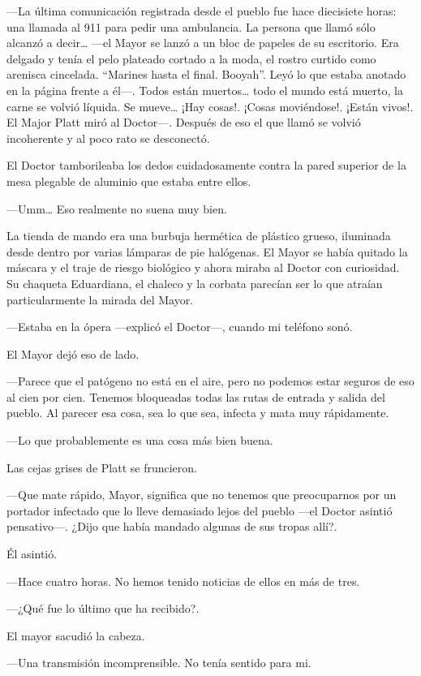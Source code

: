 ---La última comunicación registrada desde el pueblo fue hace diecisiete
horas: una llamada al 911 para pedir una ambulancia. La persona que
llamó sólo alcanzó a decir\ldots{} ---el Mayor se lanzó a un bloc de
papeles de su escritorio. Era delgado y tenía el pelo plateado cortado a
la moda, el rostro curtido como arenisca cincelada. ``Marines hasta el
final. Booyah''. Leyó lo que estaba anotado en la página frente a él---.
Todos están muertos\ldots{} todo el mundo está muerto, la carne se
volvió líquida. Se mueve\ldots{} ¡Hay cosas!. ¡Cosas moviéndose!. ¡Están
vivos!. El Major Platt miró al Doctor---. Después de eso el que llamó se
volvió incoherente y al poco rato se desconectó.

El Doctor tamborileaba los dedos cuidadosamente contra la pared superior
de la mesa plegable de aluminio que estaba entre ellos.

---Umm\ldots{} Eso realmente no suena muy bien.

La tienda de mando era una burbuja hermética de plástico grueso,
iluminada desde dentro por varias lámparas de pie halógenas. El Mayor se
había quitado la máscara y el traje de riesgo biológico y ahora miraba
al Doctor con curiosidad. Su chaqueta Eduardiana, el chaleco y la
corbata parecían ser lo que atraían particularmente la mirada del Mayor.

---Estaba en la ópera ---explicó el Doctor---, cuando mi teléfono sonó.

El Mayor dejó eso de lado.

---Parece que el patógeno no está en el aire, pero no podemos estar
seguros de eso al cien por cien. Tenemos bloqueadas todas las rutas de
entrada y salida del pueblo. Al parecer esa cosa, sea lo que sea,
infecta y mata muy rápidamente.

---Lo que probablemente es una cosa más bien buena.

Las cejas grises de Platt se fruncieron.

---Que mate rápido, Mayor, significa que no tenemos que preocuparnos por
un portador infectado que lo lleve demasiado lejos del pueblo ---el
Doctor asintió pensativo---. ¿Dijo que había mandado algunas de sus
tropas allí?.

Él asintió.

---Hace cuatro horas. No hemos tenido noticias de ellos en más de tres.

---¿Qué fue lo último que ha recibido?.

El mayor sacudió la cabeza.

---Una transmisión incomprensible. No tenía sentido para mi.

